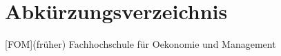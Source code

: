 \section*{Abkürzungsverzeichnis}
\begin{acronym}
    [FOM]{(früher) Fachhochschule für Oekonomie und Management}
\end{acronym}
\newpage
